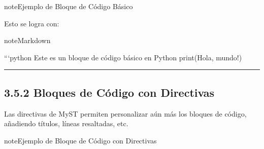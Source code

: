 \documentclass[a4paper,10pt,spanish]{sphinxmanual}
\begin{document}
\begin{sphinxadmonition}{note}{Ejemplo de Bloque de Código Básico}

\begin{sphinxVerbatim}[commandchars=\\\{\}]
\end{sphinxVerbatim}
\end{sphinxadmonition}

\sphinxAtStartPar
Esto se logra con:

\begin{sphinxadmonition}{note}{Markdown}

\begin{sphinxVerbatim}[commandchars=\\\{\}]
```python
\PYGZsh{} Este es un bloque de código básico en Python
print(\PYGZdq{}Hola, mundo!\PYGZdq{})
\end{sphinxVerbatim}
\end{sphinxadmonition}


\bigskip\hrule\bigskip



\subsection{3.5.2 Bloques de Código con Directivas}
\label{\detokenize{3_guia_myst/code_api:bloques-de-codigo-con-directivas}}
\sphinxAtStartPar
Las directivas de MyST permiten personalizar aún más los bloques de código, añadiendo títulos, líneas resaltadas, etc.

\begin{sphinxadmonition}{note}{Ejemplo de Bloque de Código con Directivas}

\def\sphinxLiteralBlockLabel{\label{\detokenize{3_guia_myst/code_api:ejemplo-de-codigo-python}}}
%
\begin{sphinxVerbatim}[commandchars=\\\{\},numbers=left,firstnumber=1,stepnumber=1]
  
\end{sphinxVerbatim}
\sphinxresetverbatimhllines
\end{sphinxadmonition}
\end{document}
